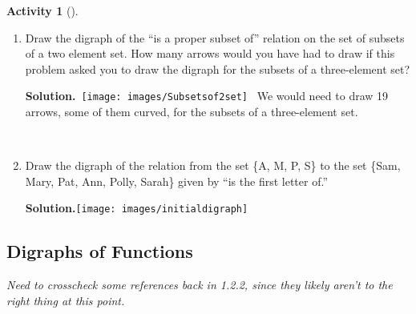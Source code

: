 \documentclass[10pt,]{book}
\theoremstyle{plain}
\theoremstyle{definition}
\newtheorem{activity}[project]{Activity}
\numberwithin{equation}{chapter}
\begin{document}
\begin{activity}[]\label{activity-322}
~\par
\begin{enumerate}[label=(\alph*)]
 \item Draw the digraph of the ``is a proper subset of'' relation on the set of subsets of a two element set. How many arrows would you have had to draw if this problem asked you to draw the digraph for the subsets of a three-element set?%
\par\medskip\noindent%
\textbf{Solution.}\quad \mbox{ \texttt{[image: images/Subsetsof2set]}
 } We would need to draw 19 arrows, some of them curved, for the subsets of a three-element set.%

~\par
\item Draw the digraph of the relation from the set \{A, M, P, S\} to the set \{Sam, Mary, Pat, Ann, Polly, Sarah\} given by ``is the first letter of.''%
\par\medskip\noindent%
\textbf{Solution.}\quad \texttt{[image: images/initialdigraph]}
%

\end{enumerate}
\end{activity}
\typeout{************************************************}
\typeout{************************************************}
\subsection[{Digraphs of Functions}]{Digraphs of Functions}\label{digraphsoffunctions}
\emph{Need to crosscheck some references back in 1.2.2, since they likely aren't to the right thing at this point.}%
\typeout{************************************************}
\typeout{************************************************}
\end{document}
